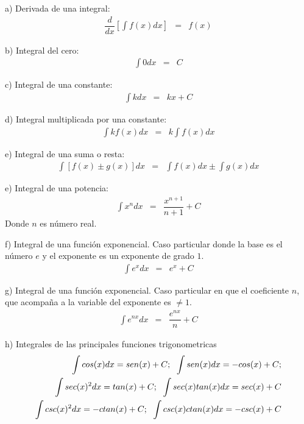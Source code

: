 \noindent a) Derivada de una integral: \\
\begin{eqnarray}
\dfrac{d}{dx}\left[ \int  f(x)dx \right]&=& f(x)
\end{eqnarray}

\noindent b) Integral del cero: \\
\begin{eqnarray}
\int 0dx &=& C
\end{eqnarray}

\noindent c) Integral de una constante:\\
\begin{eqnarray}
 \int kdx &=& kx + C
\end{eqnarray}

\noindent d) Integral multiplicada por una constante:\\
\begin{eqnarray}
 \int kf(x)dx &=&  k\int f(x)dx 
\end{eqnarray}

\noindent e) Integral de una suma o resta:\\
\begin{eqnarray}
 \int \left[f(x)\pm g(x) \right]dx &=&\int f(x)dx \pm \int g(x)dx 
\end{eqnarray}

\noindent e) Integral de una potencia:\\
\begin{eqnarray}
 \int x^{n}dx &=&\dfrac{x^{n+1}}{n+1} +C
\end{eqnarray}
Donde $n$ es número real.

\noindent f) Integral de una función exponencial. Caso particular donde la base es el número $e$ y el exponente es un exponente de grado $1$.\\
\begin{eqnarray}
 \int e^{x}dx &=&e^{x} +C
\end{eqnarray}

\noindent g) Integral de una función exponencial. Caso particular en que el coeficiente $n$, que acompaña a la variable del exponente es $\neq 1$.\\

\begin{eqnarray}
 \int e^{nx}dx &=&\dfrac{e^{nx}}{n} +C
\end{eqnarray}

\noindent h) Integrales de las principales funciones trigonometricas
\begin{eqnarray}
\int cos(x)dx= sen(x)+ C ; \hspace{6px} \int sen(x)dx= -cos(x)+C ; \\
 \int sec(x)^{2}dx= tan(x)+C; \hspace{6px} \int sec(x)tan(x)dx= sec(x)+ C \\
 \int csc(x)^{2}dx= -ctan(x)+C ; \hspace{6px}  \int csc(x)ctan(x)dx= -csc(x)+C
\end{eqnarray}
 
